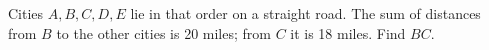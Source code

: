 Cities $A,B,C,D,E$ lie in that order on a straight road. The sum of distances from $B$ to the other cities is 20 miles; from $C$ it is 18 miles. Find $BC$.
